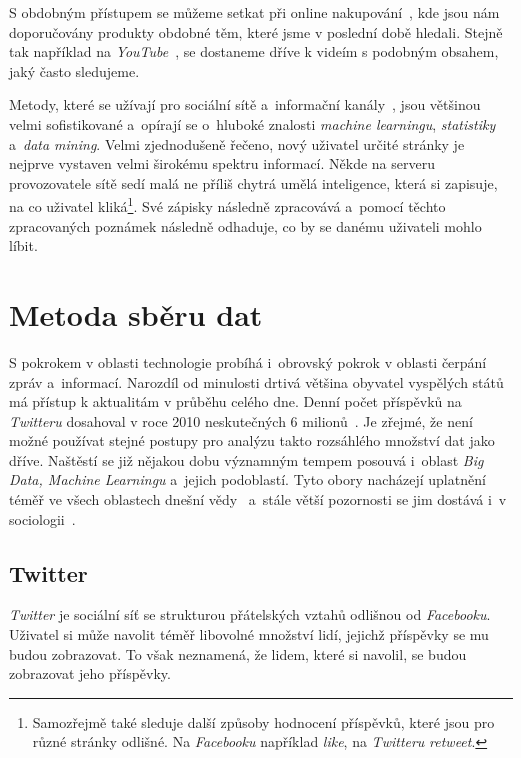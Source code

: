 \documentclass[12pt, a4paper]{article}
\numberwithin{equation}{section} 	%
\begin{document}
S obdobným přístupem se můžeme setkat při online nakupování~\cite{Amazon}, kde jsou nám doporučovány produkty obdobné těm, které jsme v poslední době hledali. Stejně tak například na \textit{YouTube}~\cite{YouTube}, se dostaneme dříve k videím s podobným obsahem, jaký často sledujeme.

Metody, které se užívají pro sociální sítě a~informační kanály~\cite{TwitterRecomendation}, jsou většinou velmi sofistikované a~opírají se o~hluboké znalosti \textit{machine learningu}, \textit{statistiky} a~\textit{data mining}. Velmi zjednodušeně řečeno, nový uživatel určité stránky je nejprve vystaven velmi širokému spektru informací. Někde na serveru provozovatele sítě sedí malá ne příliš chytrá umělá inteligence, která si zapisuje, na co uživatel kliká\footnote{Samozřejmě také sleduje další způsoby hodnocení příspěvků, které jsou pro různé stránky odlišné. Na \textit{Facebooku} například \textit{like}, na \textit{Twitteru} \textit{retweet}.}. Své zápisky následně zpracovává a~pomocí těchto zpracovaných poznámek následně odhaduje, co by se danému uživateli mohlo líbit.

\newpage
\section{Metoda sběru dat}
\noindent S pokrokem v oblasti technologie probíhá i~obrovský pokrok v oblasti čerpání zpráv a~informací. Narozdíl od minulosti drtivá většina obyvatel vyspělých států má přístup k aktualitám v průběhu celého dne. Denní počet příspěvků na \textit{Twitteru} dosahoval v roce 2010 neskutečných 6 milionů~\cite{Mathioudakis2010}. Je zřejmé, že není možné používat stejné postupy pro analýzu takto rozsáhlého množství dat jako dříve. Naštěstí se již nějakou dobu významným tempem posouvá i~oblast \textit{Big Data, Machine Learningu} a~jejich podoblastí. Tyto obory nacházejí uplatnění téměř ve všech oblastech dnešní vědy~\cite{Huberman2012-2-15} a~stále větší pozornosti se jim dostává i~v sociologii~\cite{Tinati2014, McFarland2016, Shah2015-04-09}.


\subsection{Twitter}
\noindent\textit{Twitter} je sociální síť se strukturou přátelských vztahů odlišnou od \textit{Facebooku}. Uživatel si může navolit téměř libovolné množství lidí, jejichž příspěvky se mu budou zobrazovat. To však neznamená, že lidem, které si navolil, se budou zobrazovat jeho příspěvky.
\end{document}
